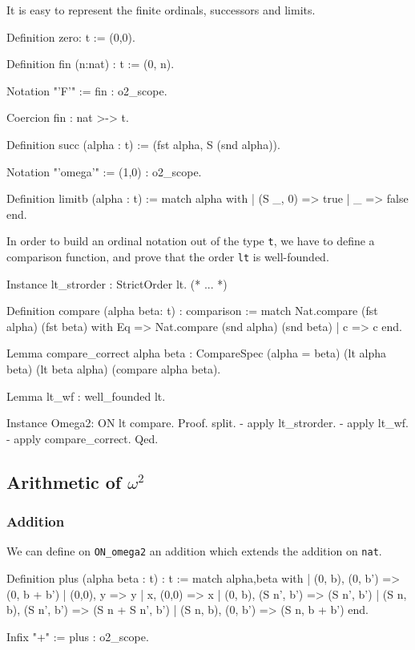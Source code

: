\documentclass[a4paper]{book}
\begin{document}
It is easy to represent the finite ordinals, successors and limits.

\begin{Coqsrc}
Definition zero: t := (0,0).

Definition fin (n:nat) : t := (0, n).

Notation "'F'" := fin : o2_scope.

Coercion fin : nat >-> t.

Definition succ (alpha : t) := (fst alpha, S (snd alpha)).

Notation "'omega'" := (1,0) : o2_scope.

Definition limitb (alpha : t) := 
 match alpha with
 |  (S _, 0) => true
 | _ => false
end.
\end{Coqsrc}


In order to build an ordinal notation out of the type \texttt{t}, we have to define a comparison function, and prove that the order \texttt{lt} is well-founded.



\begin{Coqsrc}
Instance lt_strorder : StrictOrder lt.
(* ... *)

Definition compare (alpha beta: t) : comparison :=
  match Nat.compare (fst alpha) (fst beta) with
    Eq => Nat.compare (snd alpha) (snd beta)
  | c => c
  end.

Lemma compare_correct alpha beta :
    CompareSpec (alpha = beta) (lt alpha beta) (lt beta alpha)
                (compare alpha beta).

Lemma lt_wf : well_founded lt.

Instance Omega2: ON lt compare.
Proof.
  split.
  - apply lt_strorder.
  - apply lt_wf.
  - apply compare_correct.
Qed.
\end{Coqsrc}


\subsection{Arithmetic of \texorpdfstring{$\omega^2$}{omega^2}} 

\subsubsection{Addition}

We can define on \texttt{ON\_omega2} an addition which extends the addition on \texttt{nat}.

\begin{Coqsrc}
Definition  plus (alpha beta : t) : t :=
  match alpha,beta with
  | (0, b), (0, b') => (0, b + b')
  | (0,0), y  => y
  | x, (0,0)  => x
  | (0, b), (S n', b') => (S n', b')
  | (S n, b), (S n', b') => (S n + S n', b')
  | (S n, b), (0, b') => (S n, b + b')
   end.

Infix "+" := plus : o2_scope.
\end{Coqsrc}
\end{document}
